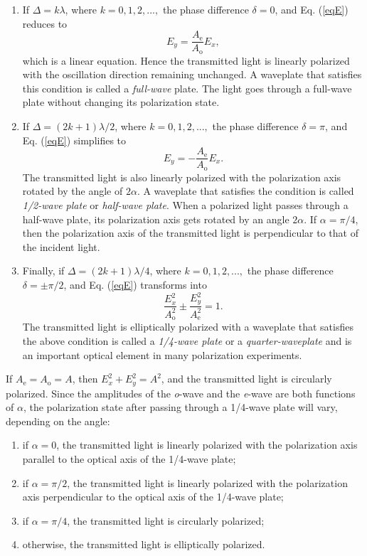 \documentclass{article}
\begin{document}
\begin{enumerate}[$\blacktriangleright$]
\item If $\Delta = k\lambda$, where $k = 0,1,2,...,$ the phase difference $\delta = 0$, and Eq. (\ref{eqE}) reduces to
$$E_y = \frac{A_\text{e}}{A_\text{o}}E_x,$$
which is a linear equation. Hence the transmitted light is linearly polarized with the oscillation direction remaining unchanged. A waveplate that satisfies this condition is called a \textit{full-wave} plate. The light goes through a full-wave plate without changing its polarization state.
\item If $\Delta = (2k + 1)\lambda/2$, where $k = 0,1,2,...,$ the phase difference $\delta = \pi$, and Eq. (\ref{eqE}) simplifies to
$$E_y = -\frac{A_\text{e}}{A_\text{o}}E_x.$$  
The transmitted light is also linearly polarized with the polarization axis rotated by the angle of $2\alpha$. A waveplate that satisfies the condition is called \textit{1/2-wave plate} or \textit{half-wave plate}. When a polarized light passes through a half-wave plate, its polarization axis gets rotated by an angle $2\alpha$. If $\alpha = \pi/4$, then the polarization axis of the transmitted light is perpendicular to that of the incident light.
\item Finally, if $\Delta = (2k + 1)\lambda/4$, where $k = 0,1,2,...,$ the phase difference $\delta = \pm\pi/2$, and Eq. (\ref{eqE}) transforms into
$$\frac{E_x^2}{A_\text{o}^2} \pm \frac{E_y^2}{A_\text{e}^2} = 1.$$
The transmitted light is elliptically polarized with a waveplate that satisfies the above condition is called a \textit{1/4-wave plate} or a \textit{quarter-waveplate} and is an important optical element in many polarization experiments.
\end{enumerate}

If $A_\text{e} = A_\text{o} = A$, then $E^2_x +E^2_y = A^2$, and the transmitted light is circularly polarized. Since the amplitudes of the \textit{o}-wave and the \textit{e}-wave are both functions of $\alpha$, the polarization state after passing through a 1/4-wave plate will vary, depending on the angle: 

\begin{enumerate}[$\blacktriangleright$]
\item if $\alpha = 0$, the transmitted light is linearly polarized with the polarization axis parallel to the optical axis of the 1/4-wave plate; 
\item if $\alpha = \pi/2$, the transmitted light is linearly polarized with the polarization axis perpendicular to the optical axis of the 1/4-wave plate; 
\item if $\alpha = \pi/4$, the transmitted light is circularly polarized; 
\item otherwise, the transmitted light is elliptically polarized.
\end{enumerate}
\end{document}
